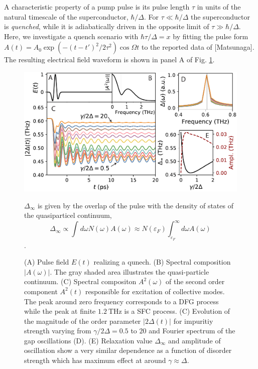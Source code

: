\documentclass[aps,prb,reprint,noeprint,superscriptaddress]{revtex4-1}
\begin{document}
A characteristic property of a pump pulse is its pulse length $\tau$ in units of the natural
timescale of the superconductor, $\hbar/\Delta$. For $\tau \ll \hbar / \Delta$
the superconductor is \textit{quenched}, while it is adiabatically driven in the
opposite limit of $\tau \gg  \hbar / \Delta$. Here, we investigate a quench
scenario with $\hbar\tau/\Delta=x$ by fitting the pulse form $A(t) = A_0 \exp\left( -(t-t')^2/2\tau^2
\right)\cos \Omega t$ to the reported data of [Matsunaga]. The resulting
electrical field waveform is shown in panel A of Fig. \ref{fig:singleband-gap}. 


\begin{figure}[ht]
	\centering
	\includegraphics[width=\columnwidth]{figures/fig1.pdf}
	\caption{(A) Pulse field $E(t)$ realizing a qunech. (B) Spectral
	composition $|A(\omega)|$. The gray shaded area illustrates the
quasi-particle continuum. (C) Spectral compositon $A^2(\omega)$ of the second
order component $A^2(t)$ responsible for excitation of collective modes. The
peak around zero frequency corresponds to a DFG process while the peak at finite
$\SI{1.2}{\tera\hertz}$ is a SFC process. (C) Evolution of the magnitude of the
order parameter $\left|2\Delta(t)\right|$ for impuritiy strength varying from
$\gamma/2\Delta=0.5$ to $20$ and Fourier spectrum of the gap oscillations (D).
(E) Relaxation value $\Delta_{\infty}$ and amplitude of oscillation show a very
similar dependence as a function of disorder strength which has maximum effect
at around $\gamma \approx \Delta$.}

$\Delta_{\infty}$ is given by the overlap of the pulse with the density of
states of the quasiparticel continuum, 
$$\Delta_{\infty} \propto
\int_{}^{}d\omega N(\omega) A(\omega) \approx N(\varepsilon_F)
\int_{\varepsilon_F}^{\infty}d\omega A(\omega)$$.
\label{fig:singleband-gap}
\end{figure}
\end{document}
